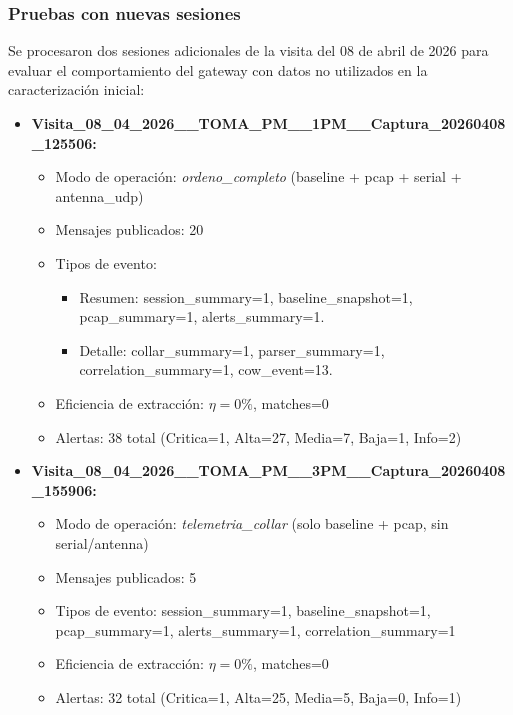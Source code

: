 \subsubsection{Pruebas con nuevas sesiones}

Se procesaron dos sesiones adicionales de la visita del 08 de abril de 2026 para evaluar el comportamiento del gateway con datos no utilizados en la caracterización inicial:

\begin{itemize}
    \item \textbf{Visita\_08\_04\_2026\_\_TOMA\_PM\_\_1PM\_\_Captura\_20260408\_125506:}
    \begin{itemize}
        \item Modo de operación: \textit{ordeno\_completo} (baseline + pcap + serial + antenna\_udp)
        \item Mensajes publicados: 20
        \item Tipos de evento:
        \begin{itemize}\raggedright
            \item Resumen: session\_summary=1, baseline\_snapshot=1, pcap\_summary=1, alerts\_summary=1.
            \item Detalle: collar\_summary=1, parser\_summary=1, correlation\_summary=1, cow\_event=13.
        \end{itemize}
        \item Eficiencia de extracción: $\eta=0\%$, matches=0
        \item Alertas: 38 total (Critica=1, Alta=27, Media=7, Baja=1, Info=2)
    \end{itemize}
    
    \item \textbf{Visita\_08\_04\_2026\_\_TOMA\_PM\_\_3PM\_\_Captura\_20260408\_155906:}
    \begin{itemize}
        \item Modo de operación: \textit{telemetria\_collar} (solo baseline + pcap, sin serial/antenna)
        \item Mensajes publicados: 5
        \item Tipos de evento: session\_summary=1, baseline\_snapshot=1, pcap\_summary=1, alerts\_summary=1, correlation\_summary=1
        \item Eficiencia de extracción: $\eta=0\%$, matches=0
        \item Alertas: 32 total (Critica=1, Alta=25, Media=5, Baja=0, Info=1)
    \end{itemize}
\end{itemize}


